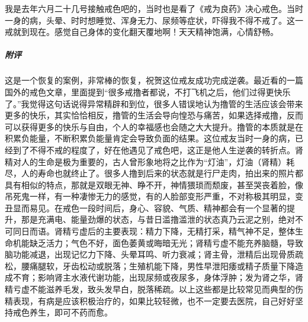 \begin{case}
    我是去年六月二十几号接触戒色吧的，当时也是看了《戒为良药》决心戒色。当时一身的病，头晕、时时想睡觉、浑身无力、尿频等症状，吓得我不得不戒了。这一戒就到现在。感觉自己身体的变化翻天覆地啊！天天精神饱满，心情舒畅。
    \subparagraph{附评} 这是一个恢复的案例，非常棒的恢复，祝贺这位戒友成功完成逆袭。最近看的一篇国外的戒色文章，里面提到“很多戒撸者都说，不打飞机之后，他们过得更快乐了。”我觉得这句话说得异常精辟和到位，很多人错误地认为撸管的生活应该会带来更多的快乐，其实恰恰相反，撸管的生活会导向惶恐与痛苦，如果选择戒撸，反而可以获得更多的快乐与自由，个人的幸福感也会随之大大提升。撸管的本质就是在积累负能量，不断积累负能量肯定会导致负面的结果。这位戒友当时一身的病，已经到了不得不戒的程度了，好在他遇见了戒色吧，这正是他人生逆袭的转折点。肾精对人的生命是极为重要的，古人曾形象地将之比作为“灯油”，灯油（肾精）耗尽，人的寿命也就终止了。很多人撸到后来的状态就是行尸走肉，拍出来的照片都具有相似的特点，那就是双眼无神、睁不开，神情猥琐而颓废，甚至哭丧着脸，像吊死鬼一样，有一种凄惨无力的感觉，有的人脸部变形严重，不对称极其明显，变丑显而易见。在戒色一段时间后，身心、容貌、气质、精神都会有一个显著的提升，那是充满电、能量劲爆的状态，与昔日滥撸滥泄的状态真乃云泥之别，绝对不可同日而语。肾精亏虚后的主要表现：精力下降，无精打采，精气神不足，整体生命机能缺乏活力；气色不好，面色萎黄或晦暗无光；肾精亏虚不能充养脑髓，导致脑功能减退，出现记忆力下降、头晕耳鸣、听力衰减；肾主骨，泄精后出现骨质疏松，腰痛腿软，牙齿松动或脱落；生殖机能下降，男性早泄阳痿或精子质量下降造成不育；影响肾主水液代谢功能，出现尿频或夜尿多，身体浮肿；发为肾之华，肾精亏虚不能滋养毛发，致头发早白，脱落稀疏。以上这些都是比较常见而典型的伤精表现，有病是应该积极治疗的，如果比较轻微，也不一定要去医院，自己好好坚持戒色养生，即可不药而愈。
\end{case}

